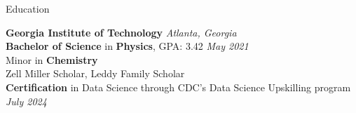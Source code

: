 \documentclass{resume} %
\begin{document}

\begin{rSection}{Education}

{\bf Georgia Institute of Technology} \hfill {\em Atlanta, Georgia} 
\\ \textbf{Bachelor of Science} in \textbf{Physics}, GPA: 3.42 \hfill {\em May 2021}
\\ Minor in \textbf{Chemistry}
\\ Zell Miller Scholar, Leddy Family Scholar
\\\textbf{Certification} in Data Science through CDC's Data Science Upskilling program \hfill {\em July 2024}
\end{rSection}
\end{document}
